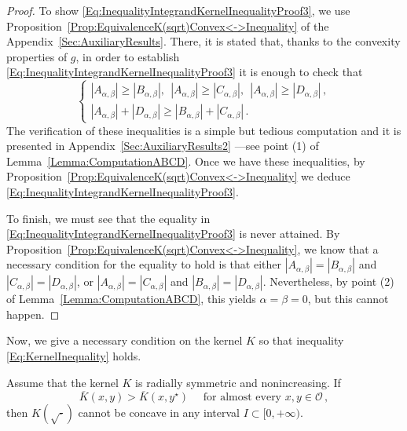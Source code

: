 \begin{proof}
To show \eqref{Eq:InequalityIntegrandKernelInequalityProof3}, we use Proposition~\ref{Prop:EquivalenceK(sqrt)Convex<->Inequality} of the Appendix~\ref{Sec:AuxiliaryResults}. There, it is stated that, thanks to the convexity properties of $g$, in order to establish \eqref{Eq:InequalityIntegrandKernelInequalityProof3} it is enough to check that
$$
\begin{cases}
|A_{\alpha,\beta}| \geq |B_{\alpha,\beta}|,\ \ |A_{\alpha,\beta}| \geq |C_{\alpha,\beta}|, \ \ |A_{\alpha,\beta}| \geq |D_{\alpha,\beta}|\,, \\
|A_{\alpha,\beta}| + |D_{\alpha,\beta}| \geq |B_{\alpha,\beta}| + |C_{\alpha,\beta}|\,.
\end{cases}
$$
The verification of these inequalities is a simple but tedious computation and it is presented in Appendix~\ref{Sec:AuxiliaryResults2} ---see point (1) of Lemma~\ref{Lemma:ComputationABCD}. Once we have these inequalities, by Proposition~\ref{Prop:EquivalenceK(sqrt)Convex<->Inequality} we deduce \eqref{Eq:InequalityIntegrandKernelInequalityProof3}.

To finish, we must see that the equality in \eqref{Eq:InequalityIntegrandKernelInequalityProof3} is never attained. By Proposition~\ref{Prop:EquivalenceK(sqrt)Convex<->Inequality}, we know that a necessary condition for the equality to hold is that either $|A_{\alpha,\beta}| = |B_{\alpha,\beta}|$ and $|C_{\alpha,\beta}| = |D_{\alpha,\beta}|$, or $|A_{\alpha,\beta}| = |C_{\alpha,\beta}|$ and $|B_{\alpha,\beta}| = |D_{\alpha,\beta}|$. Nevertheless, by point (2) of Lemma~\ref{Lemma:ComputationABCD}, this yields $\alpha = \beta = 0$, but this cannot happen.
\end{proof}


Now, we give a necessary condition on the kernel $K$ so that inequality \eqref{Eq:KernelInequality} holds.

\begin{proposition}
\label{Prop:KernelInequalityNecessaryCondition} Assume that the kernel $K$ is radially symmetric and
nonincreasing. If
\begin{equation}
\label{Eq:KernelInequalityAE}
\overline{K}(x,y) > \overline{K}(x, y^\star) \quad \text{ for almost every }x,y \in \mathcal{O}\,,
\end{equation}
then $K(\sqrt{\cdot})$ cannot be concave in any interval $I\subset [0,+\infty)$.
\end{proposition}

